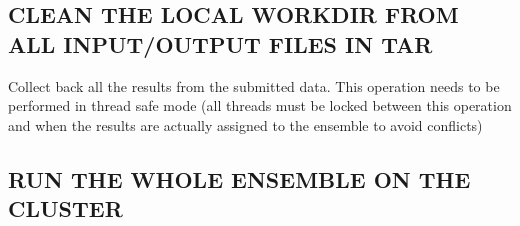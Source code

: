 \documentclass[a4paper,11pt,english]{sphinxmanual}
\begin{document}
\begin{fulllineitems}
\begin{fulllineitems}
\label{\detokenize{apireference:sscha.Cluster.Cluster.clean_localworkdir}}
\pysigstartsignatures
{}
\pysigstopsignatures

\subsection{CLEAN THE LOCAL WORKDIR FROM ALL INPUT/OUTPUT FILES IN TAR}
\label{\detokenize{apireference:clean-the-local-workdir-from-all-input-output-files-in-tar}}
\end{fulllineitems}


\begin{fulllineitems}
\label{\detokenize{apireference:sscha.Cluster.Cluster.collect_results}}
\pysigstartsignatures
{}
\pysigstopsignatures
\sphinxAtStartPar
Collect back all the results from the submitted data.
This operation needs to be performed in thread safe mode
(all threads must be locked between this operation and when the results are actually assigned to the ensemble
to avoid conflicts)

\end{fulllineitems}


\begin{fulllineitems}
\label{\detokenize{apireference:sscha.Cluster.Cluster.compute_ensemble}}
\pysigstartsignatures
{}
\pysigstopsignatures

\subsection{RUN THE WHOLE ENSEMBLE ON THE CLUSTER}
\label{\detokenize{apireference:run-the-whole-ensemble-on-the-cluster}}


\end{fulllineitems}
\end{fulllineitems}
\end{document}
